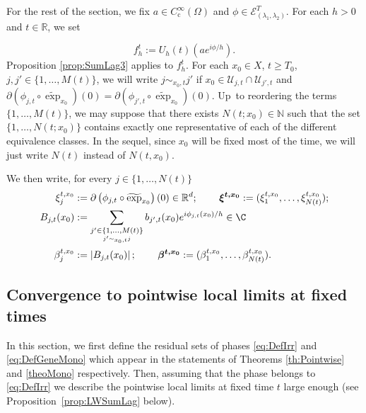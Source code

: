 \documentclass[JEP,XML,SOM,Unicode,published]{cedram}
\let\mathcal\mathscr
\newcommand{\rc}{\mathrm{c}}
\theoremstyle{plain}
\theoremstyle{definition}
\newcommand{\N}{\mathbb{N}}
\newcommand{\R}{\mathbb{R}}
\def\calE{\mathcal{E}}
\begin{document}
For the rest of the section, we fix $a\in C_\rc^\infty(\Omega)$ and $\phi\in\calE_{(\lambda_1,\lambda_2)}^T$. For each $h>0$ and $t\in\R$, we set

\[
f^t_h:= U_h(t) (a e^{i\phi/h}).
\]
Proposition \ref{prop:SumLag3} applies to $f^t_h$. For each $x_0\in X$, $t\geq T_0$, $j,j'\in \{1,\dots,M(t)\}$, we will write $j\sim_{x_0,t} j'$ if $x_0\in \mathcal{U}_{j,t}\cap \mathcal{U}_{j',t}$ and $\partial \left(\phi_{j,t}\circ \widetilde{\exp}_{x_0} \right)(0)= \partial \left(\phi_{j',t}\circ \widetilde{\exp}_{x_0} \right)(0)$. Up~to reordering the terms $\{1,\dots,M(t)\}$, we may suppose that there exists $N(t;x_0)\in \N$ such that the set $\{1,\dots,N(t;x_0)\}$ contains exactly one representative of each of the different equivalence classes. In the sequel, since $x_0$ will be fixed most of the time, we will just write $N(t)$ instead of $N(t,x_0)$.

We then write, for every $j\in \{1,\dots,N(t)\}$
\begin{equation}\label{eq:xi_beta}
\begin{aligned}
\xi^{t,x_0}_j &:= \partial \left(\phi_{j,t}\circ \widetilde{\exp}_{x_0} \right)(0)\in \mathbb{R}^{d};\, \qquad \boldsymbol{\xi^{t,x_0}}:=(\xi_1^{t,x_0},\dots,\xi_{N(t)}^{t,x_0}); \\
B_{j,t} (x_0) &:= \sum_{\underset{j'\sim_{x_0,t} j}{j'\in \{1,\dots,M(t)\}}} b_{j',t}(x_0) e^{i \phi_{j,t}(x_0)/h} \in \C\\
\beta^{t, x_0}_j&:= \left| B_{j,t} (x_0) \right| ;\, \qquad \boldsymbol{\beta^{t,x_0}}:=(\beta_1^{t,x_0},\dots,\beta_{N(t)}^{t,x_0}).
\end{aligned}
\end{equation}

\subsection{Convergence to pointwise local limits at fixed times}\label{ss:convergence}

In this section, we first define the residual sets of phases \eqref{eq:DefIrr} and \eqref{eq:DefGeneMono} which appear in the statements of Theorems \ref{th:Pointwise} and \ref{theoMono} respectively. Then, assuming that the phase belongs to \eqref{eq:DefIrr} we describe the pointwise local limits at fixed time $t$ large enough (see Proposition~\ref{prop:LWSumLag} below).
\end{document}

